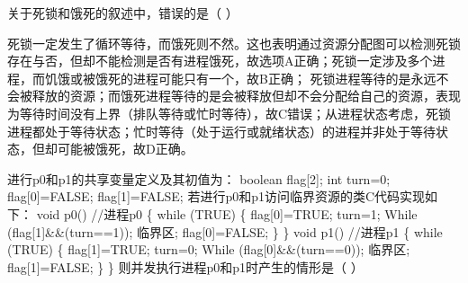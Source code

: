 \question 关于死锁和饿死的叙述中，错误的是（ ）
\par{}
\begin{solution}死锁一定发生了循环等待，而饿死则不然。这也表明通过资源分配图可以检测死锁存在与否，但却不能检测是否有进程饿死，故选项A正确；死锁一定涉及多个进程，而饥饿或被饿死的进程可能只有一个，故B正确；
死锁进程等待的是永远不会被释放的资源；而饿死进程等待的是会被释放但却不会分配给自己的资源，表现为等待时间没有上界（排队等待或忙时等待），故C错误；从进程状态考虑，死锁进程都处于等待状态；忙时等待（处于运行或就绪状态）的进程并非处于等待状态，但却可能被饿死，故D正确。
\end{solution}
\question 进行p0和p1的共享变量定义及其初值为： boolean flag{[}2{]}; int turn=0;
flag{[}0{]}=FALSE; flag{[}1{]}=FALSE;
若进行p0和p1访问临界资源的类C代码实现如下： void p0() //进程p0 \{ while
(TRUE) \{ flag{[}0{]}=TRUE; turn=1; While (flag{[}1{]}\&\&(turn==1));
临界区; flag{[}0{]}=FALSE; \} \} void p1() //进程p1 \{ while (TRUE) \{
flag{[}1{]}=TRUE; turn=0; While (flag{[}0{]}\&\&(turn==0)); 临界区;
flag{[}1{]}=FALSE; \} \} 则并发执行进程p0和p1时产生的情形是（ ）
\par{}
